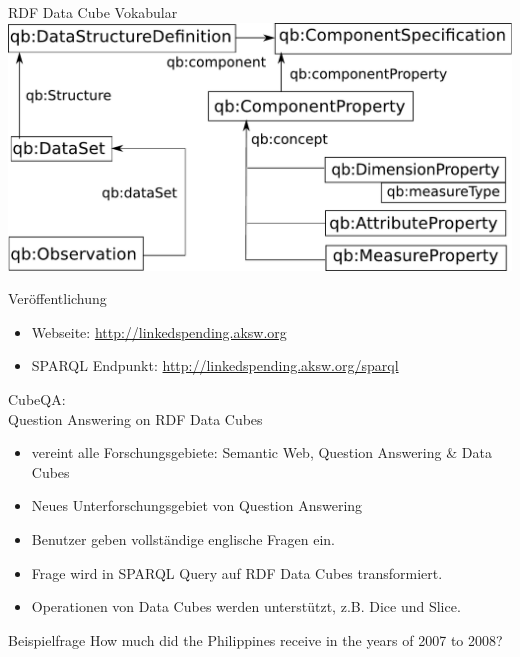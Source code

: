 \documentclass[14pt,aspectratio=1610]{beamer}
\begin{document}
\begin{frame}{RDF Data Cube Vokabular}
\includegraphics[width=\textwidth]{img/rdfdatacube_shrinked.pdf}
\end{frame}

\begin{frame}{Veröffentlichung}
\begin{itemize}
\item Webseite: \url{http://linkedspending.aksw.org}
\item SPARQL Endpunkt: \url{http://linkedspending.aksw.org/sparql}
\end{itemize}
\end{frame}


\begin{frame}{CubeQA:\\Question Answering on RDF Data Cubes }
\begin{itemize}
\item vereint alle Forschungsgebiete: Semantic Web, Question Answering \& Data Cubes
\item Neues Unterforschungsgebiet von Question Answering
\item Benutzer geben vollständige englische Fragen ein.
\item Frage wird in SPARQL Query auf RDF Data Cubes transformiert.
\item Operationen von Data Cubes werden unterstützt, z.B. Dice und Slice. 
\end{itemize}
\end{frame}

\begin{frame}{Beispielfrage}
\centering\large
How much did the Philippines receive in the years of 2007 to 2008?
\end{frame}
\end{document}
